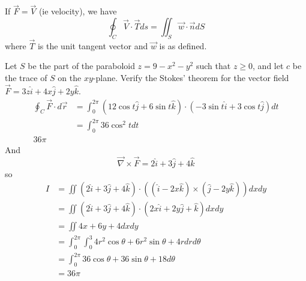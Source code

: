 \documentclass[12pt]{article}
\begin{document}
If $\vec{F} = \vec{V}$ (ie velocity), we have
$$\oint_C \vec{V}\cdot\vec{T}ds = \iint_S \vec{w}\cdot\vec{n}dS$$
where $\vec{T}$ is the unit tangent vector and $\vec{w}$ is as defined.

\begin{ex}
	Let $S$ be the part of the paraboloid $z=9-x^2-y^2$ such that $z\geq0$, and let $c$ be the trace of $S$ on the $xy$-plane. Verify the Stokes' theorem for the vector field $\vec{F} = 3z\hat{i} + 4x\hat{j} + 2y\hat{k}$.
	\begin{align*}
		\oint_C\vec{F}\cdot d\vec{r} &= \int_0^{2\pi} (12\cos t\hat{j} + 6\sin t\hat{k})\cdot (-3\sin t\hat{i} + 3\cos t\hat{j}) dt \\
					     &= \int_0^{2\pi} 36\cos^2t dt \\
					     36\pi
	\end{align*}
	And
	$$\vec{\nabla}\times\vec{F} = 2\hat{i} + 3\hat{j} + 4\hat{k}$$
	so
	\begin{align*}
		I &= \iint (2\hat{i} + 3\hat{j} + 4\hat{k}) \cdot ((\hat{i} - 2x\hat{k}) \times (\hat{j} - 2y\hat{k})) dxdy \\
		  &= \iint (2\hat{i} + 3\hat{j} + 4\hat{k}) \cdot (2x\hat{i} + 2y\hat{j} + \hat{k}) dxdy \\
		  &= \iint 4x + 6y + 4 dxdy \\
		  &= \int_0^{2\pi} \int_0^3 4r^2\cos\theta + 6r^2\sin\theta + 4r drd\theta \\
		  &= \int_0^{2\pi} 36\cos\theta + 36\sin\theta + 18 d\theta \\
		  &= 36\pi
	\end{align*}
\end{ex}
\end{document}
